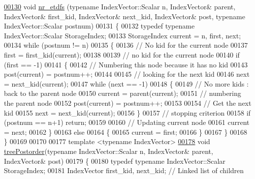 \begin{DoxyCode}
\hyperlink{namespace_eigen_1_1internal_acbd726e03f667e0dc788c6b4e92d61ec}{00130} \textcolor{keywordtype}{void} \hyperlink{namespace_eigen_1_1internal_acbd726e03f667e0dc788c6b4e92d61ec}{nr\_etdfs} (\textcolor{keyword}{typename} IndexVector::Scalar n, IndexVector& parent, IndexVector& first\_kid, 
      IndexVector& next\_kid, IndexVector& post, \textcolor{keyword}{typename} IndexVector::Scalar postnum)
00131 \{
00132   \textcolor{keyword}{typedef} \textcolor{keyword}{typename} IndexVector::Scalar StorageIndex;
00133   StorageIndex current = n, first, next;
00134   \textcolor{keywordflow}{while} (postnum != n) 
00135   \{
00136     \textcolor{comment}{// No kid for the current node}
00137     first = first\_kid(current);
00138     
00139     \textcolor{comment}{// no kid for the current node}
00140     \textcolor{keywordflow}{if} (first == -1) 
00141     \{
00142       \textcolor{comment}{// Numbering this node because it has no kid }
00143       post(current) = postnum++;
00144       
00145       \textcolor{comment}{// looking for the next kid }
00146       next = next\_kid(current); 
00147       \textcolor{keywordflow}{while} (next == -1) 
00148       \{
00149         \textcolor{comment}{// No more kids : back to the parent node}
00150         current = parent(current); 
00151         \textcolor{comment}{// numbering the parent node }
00152         post(current) = postnum++;
00153         
00154         \textcolor{comment}{// Get the next kid }
00155         next = next\_kid(current); 
00156       \}
00157       \textcolor{comment}{// stopping criterion }
00158       \textcolor{keywordflow}{if} (postnum == n+1) \textcolor{keywordflow}{return}; 
00159       
00160       \textcolor{comment}{// Updating current node }
00161       current = next; 
00162     \}
00163     \textcolor{keywordflow}{else} 
00164     \{
00165       current = first; 
00166     \}
00167   \}
00168 \}
00169 
00170 
00177 \textcolor{keyword}{template} <\textcolor{keyword}{typename} IndexVector>
\hyperlink{namespace_eigen_1_1internal_ab414b5990bd6c865958a9231ff418d20}{00178} \textcolor{keywordtype}{void} \hyperlink{namespace_eigen_1_1internal_ab414b5990bd6c865958a9231ff418d20}{treePostorder}(\textcolor{keyword}{typename} IndexVector::Scalar n, IndexVector& parent, IndexVector& post)
00179 \{
00180   \textcolor{keyword}{typedef} \textcolor{keyword}{typename} IndexVector::Scalar StorageIndex;
00181   IndexVector first\_kid, next\_kid; \textcolor{comment}{// Linked list of children }

\end{DoxyCode}

